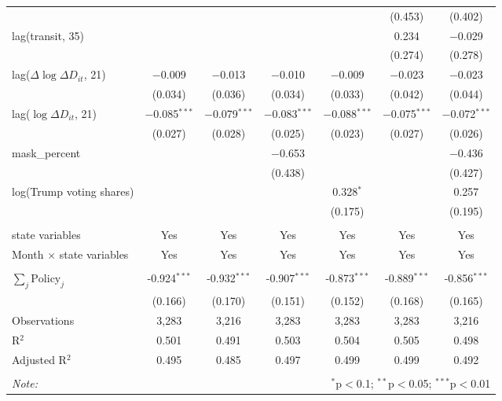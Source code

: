 \begin{tabular}{@{\extracolsep{1pt}}lcccccc}
  &  &  &  &  & (0.453) & (0.402) \\ 
  lag(transit, 35) &  &  &  &  & 0.234 & $-$0.029 \\ 
  &  &  &  &  & (0.274) & (0.278) \\ 
  lag($\Delta \log \Delta D_{it}$, 21) & $-$0.009 & $-$0.013 & $-$0.010 & $-$0.009 & $-$0.023 & $-$0.023 \\ 
  & (0.034) & (0.036) & (0.034) & (0.033) & (0.042) & (0.044) \\ 
  lag($\log \Delta D_{it}$, 21) & $-$0.085$^{***}$ & $-$0.079$^{***}$ & $-$0.083$^{***}$ & $-$0.088$^{***}$ & $-$0.075$^{***}$ & $-$0.072$^{***}$ \\ 
  & (0.027) & (0.028) & (0.025) & (0.023) & (0.027) & (0.026) \\ 
  mask\_percent &  &  & $-$0.653 &  &  & $-$0.436 \\ 
  &  &  & (0.438) &  &  & (0.427) \\ 
  log(Trump voting shares) &  &  &  & 0.328$^{*}$ &  & 0.257 \\ 
  &  &  &  & (0.175) &  & (0.195) \\ 
 \hline \\[-1.8ex] 
state variables & Yes & Yes & Yes & Yes & Yes & Yes \\ 
Month $\times$ state variables & Yes & Yes & Yes & Yes & Yes & Yes \\ 
\hline \\[-1.8ex] 
$\sum_j \mathrm{Policy}_j$ & -0.924$^{***}$ & -0.932$^{***}$ & -0.907$^{***}$ & -0.873$^{***}$ & -0.889$^{***}$ & -0.856$^{***}$ \\ 
 & (0.166) & (0.170) & (0.151) & (0.152) & (0.168) & (0.165) \\ 
Observations & 3,283 & 3,216 & 3,283 & 3,283 & 3,283 & 3,216 \\ 
R$^{2}$ & 0.501 & 0.491 & 0.503 & 0.504 & 0.505 & 0.498 \\ 
Adjusted R$^{2}$ & 0.495 & 0.485 & 0.497 & 0.499 & 0.499 & 0.492 \\ 
\hline 
\hline \\[-1.8ex] 
\textit{Note:}  & \multicolumn{6}{r}{$^{*}$p$<$0.1; $^{**}$p$<$0.05; $^{***}$p$<$0.01} \\ 
\end{tabular} 